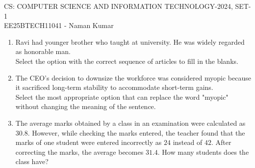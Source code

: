 \documentclass[a4paper, 11pt]{article}
\begin{document}
\begin{center}
    \huge{CS: COMPUTER SCIENCE AND INFORMATION TECHNOLOGY-2024, SET-1}\\
    \large{EE25BTECH11041 - Naman Kumar}
\end{center}


\begin{enumerate}
    \item Ravi had \underline{\hspace{2cm}} younger brother who taught at \underline{\hspace{2cm}} university. He was widely regarded as \underline{\hspace{2cm}} honorable man.\\Select the option with the correct sequence of articles to fill in the blanks.
    \begin{enumerate}
    \end{enumerate}
    \hfill{}
    \item The CEO's decision to downsize the workforce was considered myopic because it sacrificed long-term stability to accommodate short-term gains.\\Select the most appropriate option that can replace the word "myopic" without changing the meaning of the sentence.
    \begin{enumerate}
    \end{enumerate}
    \hfill{}
    \item The average marks obtained by a class in an examination were calculated as $30.8$. However, while checking the marks entered, the teacher found that the marks of one student were entered incorrectly as $24$ instead of $42$. After correcting the marks, the average becomes $31.4$. How many students does the class have?

\end{enumerate}
\end{document}
